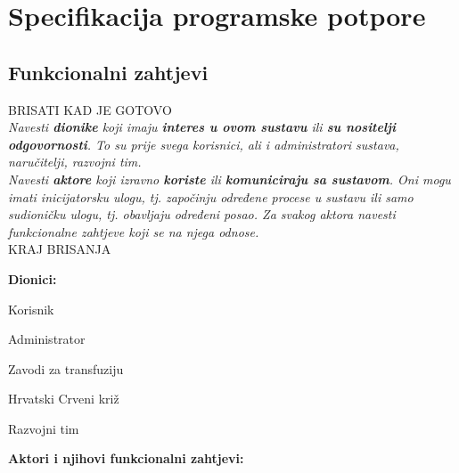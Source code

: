 \chapter{Specifikacija programske potpore}
		
	\section{Funkcionalni zahtjevi}
			BRISATI KAD JE GOTOVO\\
			\textit{Navesti \textbf{dionike} koji imaju \textbf{interes u ovom sustavu} ili  \textbf{su nositelji odgovornosti}. To su prije svega korisnici, ali i administratori sustava, naručitelji, razvojni tim.}\\
				
			\textit{Navesti \textbf{aktore} koji izravno \textbf{koriste} ili \textbf{komuniciraju sa sustavom}. Oni mogu imati inicijatorsku ulogu, tj. započinju određene procese u sustavu ili samo sudioničku ulogu, tj. obavljaju određeni posao. Za svakog aktora navesti funkcionalne zahtjeve koji se na njega odnose.}\\
			KRAJ BRISANJA
			
			\noindent \textbf{Dionici:}
			
			\begin{packed_enum}
				
				\item Korisnik
				\item Administrator			
				\item Zavodi za transfuziju
				\item Hrvatski Crveni križ
				\item Razvojni tim
    
				
			\end{packed_enum}
			
			\noindent \textbf{Aktori i njihovi funkcionalni zahtjevi:}
			
